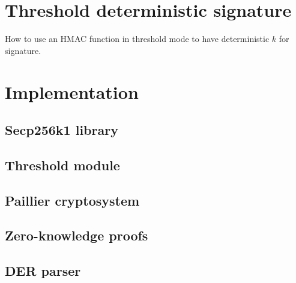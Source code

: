 \section{Threshold deterministic signature}

How to use an HMAC function in threshold mode to have deterministic $k$ for signature.

\section{Implementation}

\lipsum[1-2]

\subsection{Secp256k1 library}
\lipsum[1-2]

\subsection{Threshold module}
\lipsum[1-2]

\subsection{Paillier cryptosystem}
\lipsum[1-2]

\subsection{Zero-knowledge proofs}
\lipsum[1-2]

\subsection{DER parser}
\lipsum[1-2]

